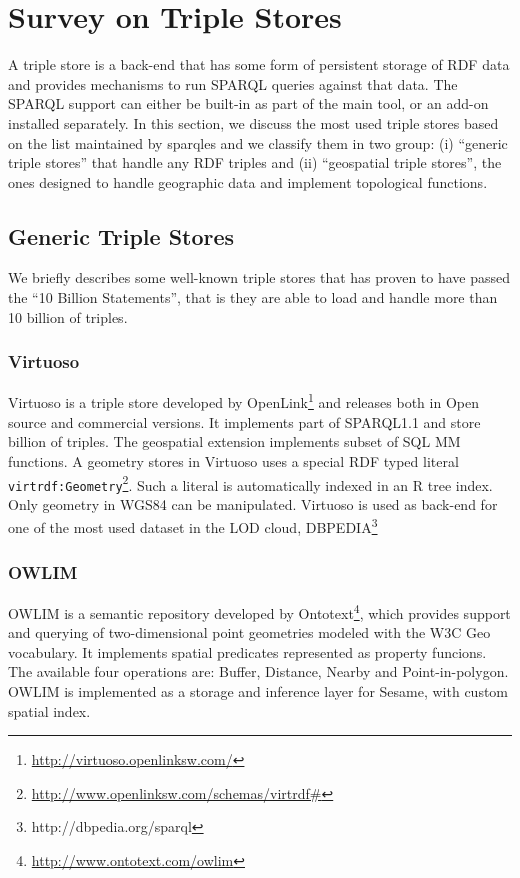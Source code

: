 \section{Survey on Triple Stores}
\label{sec:surveytps}

A triple store is a back-end that has some form of persistent storage of RDF data and provides mechanisms to run SPARQL \cite{sparql11} queries against that data. The SPARQL support can either be built-in as part of the main tool, or an add-on installed separately. In this section, we discuss the most used triple stores based on the list maintained by sparqles \cite{sparqles13} and we classify them in two group: (i) ``generic triple stores'' that handle any RDF triples and (ii) ``geospatial triple stores'', the ones designed to handle geographic data and implement topological functions. 


\subsection{Generic Triple Stores}
\label{sec:genrictps}

We briefly describes some well-known triple stores that has proven to have passed the ``10 Billion Statements'', that is they are able to load and handle more than 10 billion of triples. 
\subsubsection{Virtuoso}
Virtuoso is a triple store developed by OpenLink\footnote{\url{http://virtuoso.openlinksw.com/}} and releases both in Open source and commercial versions. It implements part of SPARQL1.1 and store billion of triples. The geospatial extension implements subset of SQL MM functions. A geometry stores in Virtuoso uses a special RDF typed literal \texttt{virtrdf:Geometry}\footnote{\url{http://www.openlinksw.com/schemas/virtrdf\#}}. Such a literal is automatically indexed in an R tree index. Only geometry in WGS84 can be manipulated. Virtuoso is used as back-end for one of the most used dataset in the LOD cloud, \textsc{DBPEDIA}\footnote{http://dbpedia.org/sparql}  


\subsubsection{OWLIM}
OWLIM is a semantic repository developed by Ontotext\footnote{\url{http://www.ontotext.com/owlim}}, which provides support and querying of 
two-dimensional point geometries modeled with the W3C Geo vocabulary. It implements spatial predicates represented as property funcions. The available four operations are: Buffer, Distance, Nearby and Point-in-polygon. OWLIM is implemented as a storage and inference layer for Sesame, with custom spatial index. 

